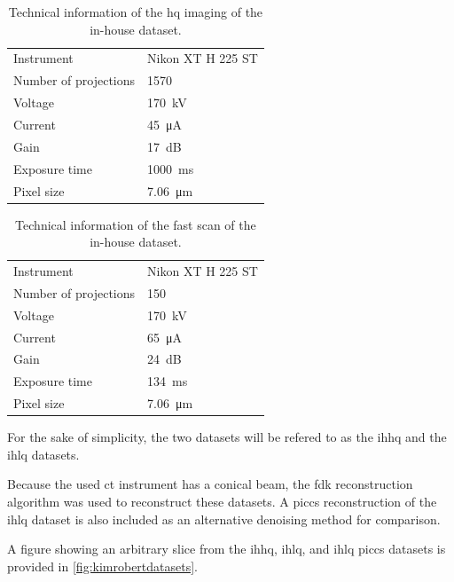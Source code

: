 \begin{table}[htbp]
    \centering
    \caption[Technical information of the IHHQ dataset]{Technical information of the \acrlong{hq} imaging of the in-house dataset. }
    \label{tab:inhousehq}
    \begin{tabular}{ll}
    \hline
    Instrument & Nikon XT H 225 ST \\
    Number of projections & 1570 \\
    Voltage & \SI{170}{\kilo \volt}\\
    Current & \SI{45}{\micro \ampere}\\
    Gain & \SI{17}{\deci \bel}\\
    Exposure time & \SI{1000}{\milli \second}\\
    Pixel size & \SI{7.06}{\micro \meter} \\
    \hline
    \end{tabular}
\end{table}

\begin{table}[htbp]
    \centering
    \caption[Technical information of the IHLQ dataset]{Technical information of the fast scan of the in-house dataset. }
    \label{tab:inhouselq}
    \begin{tabular}{ll}
    \hline
    Instrument & Nikon XT H 225 ST \\
    Number of projections & 150 \\
    Voltage & \SI{170}{\kilo \volt}\\
    Current & \SI{65}{\micro \ampere}\\
    Gain & \SI{24}{\deci \bel}\\
    Exposure time & \SI{134}{\milli \second}\\
    Pixel size & \SI{7.06}{\micro \meter} \\
    \hline
    \end{tabular}
\end{table}

For the sake of simplicity, the two datasets will be refered to as the \gls{ihhq} and the \gls{ihlq} datasets. 

Because the used \gls{ct} instrument has a conical beam, the \gls{fdk} reconstruction algorithm was used to reconstruct these datasets. A \gls{piccs} reconstruction of the \gls{ihlq} dataset is also included as an alternative denoising method for comparison. 

A figure showing an arbitrary slice from the \gls{ihhq}, \gls{ihlq}, and \gls{ihlq} \gls{piccs} datasets is provided in \cref{fig:kimrobertdatasets}.

